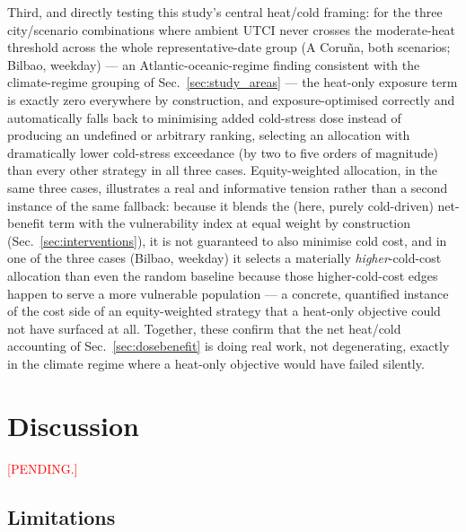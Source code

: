 \documentclass[pdflatex,sn-mathphys-ay]{sn-jnl}
\begin{document}
Third, and directly testing this study's central heat/cold framing: for the
three city/scenario combinations where ambient UTCI never crosses the
moderate-heat threshold across the whole representative-date group (A
Coru\~na, both scenarios; Bilbao, weekday) --- an Atlantic-oceanic-regime
finding consistent with the climate-regime grouping of
Sec.~\ref{sec:study_areas} --- the heat-only exposure term is exactly zero
everywhere by construction, and exposure-optimised correctly and
automatically falls back to minimising added cold-stress dose instead of
producing an undefined or arbitrary ranking, selecting an allocation with
dramatically lower cold-stress exceedance (by two to five orders of
magnitude) than every other strategy in all three cases. Equity-weighted
allocation, in the same three cases, illustrates a real and informative
tension rather than a second instance of the same fallback: because it
blends the (here, purely cold-driven) net-benefit term with the
vulnerability index at equal weight by construction
(Sec.~\ref{sec:interventions}), it is not guaranteed to also minimise cold
cost, and in one of the three cases (Bilbao, weekday) it selects a
materially \emph{higher}-cold-cost allocation than even the random baseline
because those higher-cold-cost edges happen to serve a more vulnerable
population --- a concrete, quantified instance of the cost side of an
equity-weighted strategy that a heat-only objective could not have surfaced
at all. Together, these confirm that the net heat/cold accounting of
Sec.~\ref{sec:dosebenefit} is doing real work, not degenerating, exactly in
the climate regime where a heat-only objective would have failed silently.

\section{Discussion}
\label{sec:discussion}

\textcolor{red}{[PENDING.]}

\subsection{Limitations}
\label{sec:limitations}
\end{document}
